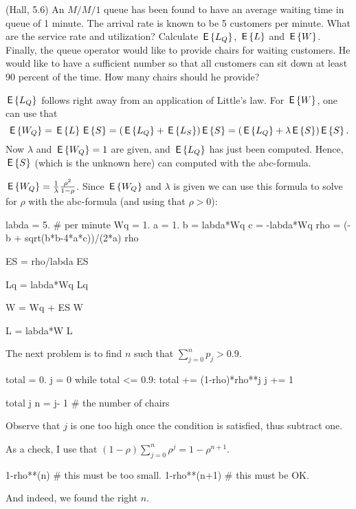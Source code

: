 \begin{exercise}(Hall, 5.6)
  An $M/M/1$ queue has been found to have an average waiting time in queue of 1 minute. The arrival rate is known to be 5 customers per minute.
 What are the service rate and utilization? Calculate $\,\mathsf{E}\left\{L_Q\right\}$,  $\,\mathsf{E}\left\{L\right\}$ and $\,\mathsf{E}\left\{W\right\}$. Finally, 
 the queue operator would like to provide chairs for waiting customers. He would like to have a sufficient number so that all customers can sit down at least 90 percent of the time. How many chairs should he provide?

 \begin{hint}
$\,\mathsf{E}\left\{L_Q\right\}$ follows right away from an application of Little's law. For $\,\mathsf{E}\left\{W\right\}$, one can use that 
\begin{equation*}
\,\mathsf{E}\left\{W_Q\right\}= \,\mathsf{E}\left\{L\right\} \,\mathsf{E}\left\{S\right\} = (\,\mathsf{E}\left\{L_Q\right\} + \,\mathsf{E}\left\{L_S\right\}) \,\mathsf{E}\left\{S\right\} = (\,\mathsf{E}\left\{L_Q\right\} + \lambda \,\mathsf{E}\left\{S\right\})\,\mathsf{E}\left\{S\right\}.
\end{equation*}
Now $\lambda$ and $\,\mathsf{E}\left\{W_Q\right\}=1$ are given, and $\,\mathsf{E}\left\{L_Q\right\}$ has just been computed. Hence, $\,\mathsf{E}\left\{S\right\}$ (which is the unknown here) can computed with the abc-formula.
 \end{hint}
    \begin{solution}
 $\,\mathsf{E}\left\{W_Q\right\} = \frac{1}{\lambda}\frac{\rho^2}{1-\rho}$. Since
        $\,\mathsf{E}\left\{W_Q\right\}$ and $\lambda$ is given we can use this formula to
        solve for $\rho$ with the abc-formula (and using that
        $\rho > 0$):

\begin{pyconsole}
labda = 5. # per minute
Wq = 1.
a = 1.
b = labda*Wq
c = -labda*Wq
rho = (-b + sqrt(b*b-4*a*c))/(2*a)
rho 

ES = rho/labda
ES
\end{pyconsole} 


\begin{pyconsole}
Lq = labda*Wq
Lq

W = Wq + ES
W

L = labda*W
L
\end{pyconsole} 


The next problem is to find $n$ such that
      $\sum_{j=0}^n p_j > 0.9$.

\begin{pyconsole} 
total = 0. 
j = 0
while total <= 0.9:
   total += (1-rho)*rho**j
   j += 1

total
j
n = j- 1 # the number of chairs 
\end{pyconsole} 

Observe that $j$ is one too high once the condition is satisfied, thus subtract one.

As a check, I use that $(1-\rho) \sum_{j=0}^n \rho^j = 1-\rho^{n+1}$.

\begin{pyconsole}
1-rho**(n) #  this must be too small.
1-rho**(n+1) # this must be OK.
\end{pyconsole} 

And indeed, we found the right $n$.

    \end{solution}
\end{exercise}

